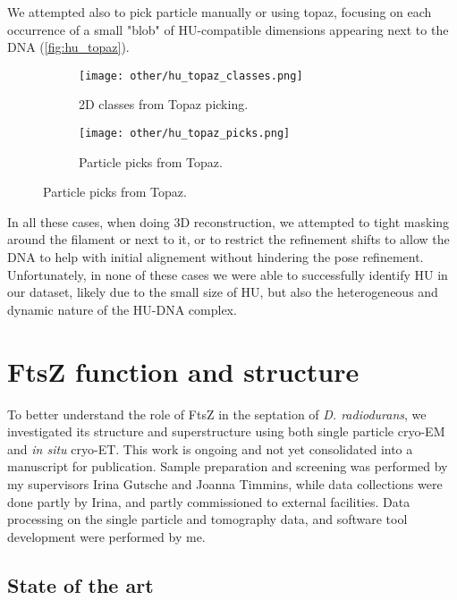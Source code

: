 We attempted also to pick particle manually or using topaz, focusing on each occurrence of a small "blob" of HU-compatible dimensions appearing next to the DNA (\autoref{fig:hu_topaz}).

\begin{figure}[ht]
    \centering
    \begin{subfigure}[B]{.49\textwidth}
        \centering
        \texttt{[image: other/hu\_topaz\_classes.png]}
        \caption{2D classes from Topaz picking.}
        \label{fig:hu_topaz_classes}
    \end{subfigure}%
    \hfill
    \begin{subfigure}[B]{.49\textwidth}
        \centering
        \texttt{[image: other/hu\_topaz\_picks.png]}
        \caption{Particle picks from Topaz.}
        \label{fig:hu_topaz_picks}
    \end{subfigure}%
    \label{fig:hu_topaz}
\end{figure}

In all these cases, when doing 3D reconstruction, we attempted to tight masking around the filament or next to it, or to restrict the refinement shifts to allow the DNA to help with initial alignement without hindering the pose refinement.
Unfortunately, in none of these cases we were able to successfully identify HU in our dataset, likely due to the small size of HU, but also the heterogeneous and dynamic nature of the HU-DNA complex.


\section{FtsZ function and structure}\label{ftsz}

To better understand the role of FtsZ in the septation of \textit{D. radiodurans}, we investigated its structure and superstructure using both single particle cryo-EM and \textit{in situ} cryo-ET.
This work is ongoing and not yet consolidated into a manuscript for publication.
Sample preparation and screening was performed by my supervisors Irina Gutsche and Joanna Timmins, while data collections were done partly by Irina, and partly commissioned to external facilities.
Data processing on the single particle and tomography data, and software tool development were performed by me.

\subsection{State of the art}

